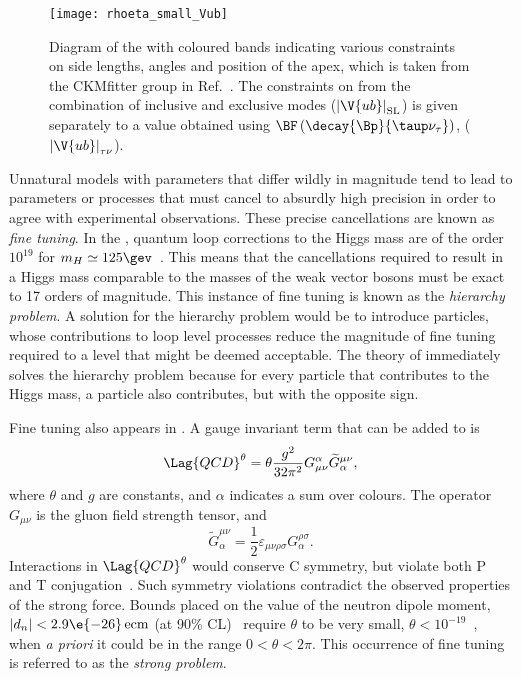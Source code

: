 \begin{figure}
  \begin{center}
      \texttt{[image: rhoeta\_small\_Vub]}
  \end{center}
  \caption[Unitarity triangle and current constraints]
  {
    Diagram of the \ut with coloured bands indicating various constraints on
    side lengths, angles and position of the apex, which is taken from the CKMfitter group in
    Ref.~\protect\cite{Charles:2015gya}.
    The constraints on  from the combination of inclusive and exclusive modes
    ($\left|\V{ub}\right|_\mathrm{SL}$) is given separately to a value obtained using
    $\BF\left(\decay{\Bp}{\taup\nu_\tau}\right)$, ($\left|\V{ub}\right|_{\tau\nu}$).
  }
  \label{fig:th:ckmfitter}
\end{figure}

Unnatural \np models with parameters that differ wildly in magnitude tend to
lead to parameters or processes that must cancel to absurdly
high precision in order to agree with experimental observations.
These precise cancellations are known as \emph{fine tuning}.
In the \sm, quantum loop corrections to the Higgs mass are of the order $10^{19}$
for $m_H\simeq125\gev$~\cite{Chatrchyan:2012ufa,Aad:2012tfa}.
This means that the cancellations required to result in a Higgs mass comparable to the masses of
the weak vector bosons must be exact to 17 orders of magnitude.
This instance of fine tuning is known as the \emph{hierarchy problem}.
A solution for the hierarchy problem would be to introduce \np particles, whose contributions to
loop level processes reduce the magnitude of fine tuning required to a level that might be deemed
acceptable.
The theory of \SUSY immediately solves the hierarchy problem because for every \sm particle that
contributes to the Higgs mass, a \SUSY particle also contributes, but with the opposite sign.

Fine tuning also appears in \QCD.
A gauge invariant term that can be added to  is
\begin{equation}
  \Lag{QCD}^\theta = \theta\frac{g^2}{32\pi^2}
  G_{\mu\nu}^\alpha\widetilde G^{\mu\nu}_\alpha,
  \label{eq:strongcp}
\end{equation}
where $\theta$ and $g$ are constants, and $\alpha$ indicates a sum over colours.
The operator $G_{\mu\nu}$ is the gluon field strength tensor, and
\begin{equation}
  \widetilde G^{\mu\nu}_\alpha = \frac12\varepsilon_{\mu\nu\rho\sigma}G^{\rho\sigma}_\alpha.
\end{equation}
Interactions in $\Lag{QCD}^\theta$ would conserve \gls{C} symmetry, but violate both \gls{P} and
\gls{T} conjugation~\cite{Peccei:2006as}.
Such symmetry violations contradict the observed properties of the strong
force.
Bounds placed on the value of the neutron dipole moment, $|d_n| <2.9\e{-26}\,\mathrm{ecm}$
(at 90\% CL)~\cite{Baker:2006ts} require $\theta$ to be very small,
$\theta<10^{-19}$~\cite{Crewther:PQref9}, when \emph{a priori} it could be in the range
$0<\theta<2\pi$.
This occurrence of fine tuning is referred to as the \emph{strong \CP problem}.

